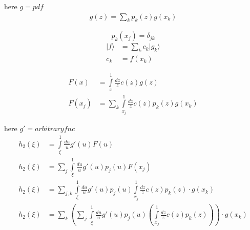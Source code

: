 \documentclass[
  english,		%
  a4paper,		%
  11pt,			%
  DIV=12,		%
  titlepage,
  toc=bibnumbered,
  parskip=full,  	%
  headings=normal,
  BCOR=12mm,
  numbers=noenddot
]{scrartcl}
\begin{document}
here $g = pdf$
\begin{align}
g(z) =  \sum\limits_k p_k(z) g(x_k)
\end{align}

\[ p_k(x_j) = \delta_{jk} \]
\[   \]
\begin{align}
|f\rangle  &= \sum_k c_k | g_k \rangle\\
c_k &= f(x_k)
\end{align}

\begin{align}
F(x) &= \int\limits_{x}^1 \frac{dz}{z} c(z) g(z)\\
F(x_j) &= \sum\limits_k \int\limits_{x_j}^1 \frac{dz}{z} c(z) p_k(z) g(x_k)
\end{align}

here $g' = arbitrary fnc$
\begin{align}
h_2(\xi) &= \int\limits_{\xi}^1 \frac{du}{u} g'(u) F(u)\\
h_2(\xi) &= \sum_j \int\limits_{\xi}^1 \frac{du}{u} g'(u) p_j(u) F(x_j)\\
h_2(\xi) &= \sum_{j,k} \int\limits_{\xi}^1 \frac{du}{u} g'(u) p_j(u) \int\limits_{x_j}^1 \frac{dz}{z} c(z) p_k(z) \cdot g(x_k)\\
h_2(\xi) &= \sum_{k} \left(\sum_j \int\limits_{\xi}^1 \frac{du}{u} g'(u) p_j(u) \left( \int\limits_{x_j}^1 \frac{dz}{z} c(z) p_k(z) \right)\right) \cdot g(x_k)
\end{align}
\end{document}
